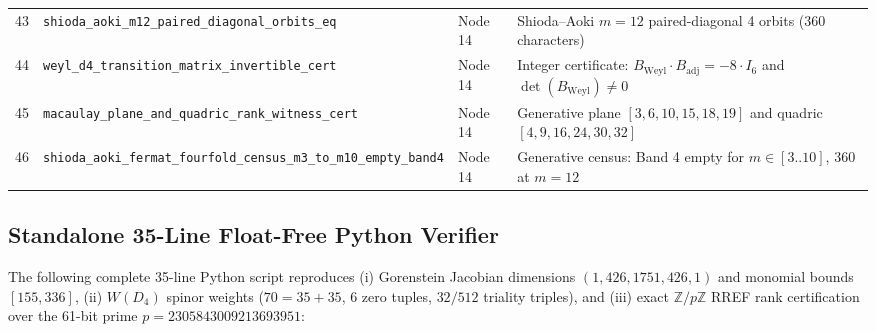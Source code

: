 \documentclass[11pt,a4paper]{article}
\theoremstyle{definition}
\theoremstyle{remark}
\begin{document}
{\begin{longtable}{r >{\ttfamily\scriptsize}p{6.4cm} l p{6.8cm}}
43 & \texttt{shioda\_aoki\_m12\_paired\_diagonal\_orbits\_eq} & Node 14 & Shioda--Aoki $m=12$ paired-diagonal 4 orbits (360 characters) \\
44 & \texttt{weyl\_d4\_transition\_matrix\_invertible\_cert} & Node 14 & Integer certificate: $B_{\mathrm{Weyl}} \cdot B_{\mathrm{adj}} = -8 \cdot I_6$ and $\det(B_{\mathrm{Weyl}}) \neq 0$ \\
45 & \texttt{macaulay\_plane\_and\_quadric\_rank\_witness\_cert} & Node 14 & Generative plane $[3,6,10,15,18,19]$ and quadric $[4,9,16,24,30,32]$ \\
46 & \texttt{shioda\_aoki\_fermat\_}\allowbreak\texttt{fourfold\_census\_m3\_}\allowbreak\texttt{to\_m10\_empty\_band4} & Node 14 & Generative census: Band 4 empty for $m \in [3..10]$, 360 at $m=12$ \\
\bottomrule
\end{longtable}
}

\subsection{Standalone 35-Line Float-Free Python Verifier}
The following complete 35-line Python script reproduces (i) Gorenstein Jacobian dimensions $(1, 426, 1751, 426, 1)$ and monomial bounds $[155, 336]$, (ii) $W(D_4)$ spinor weights ($70 = 35+35$, $6$ zero tuples, $32/512$ triality triples), and (iii) exact $\mathbb{Z}/p\mathbb{Z}$ RREF rank certification over the 61-bit prime $p = 2305843009213693951$:
\end{document}
